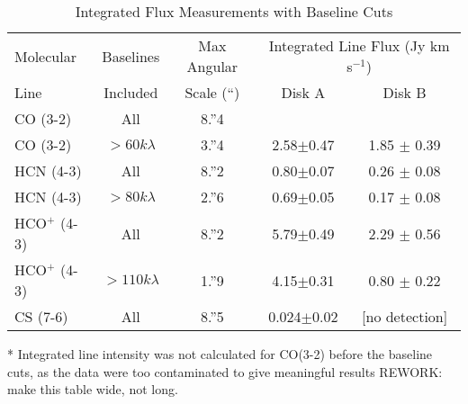 



\begin{table}
  \begin{threeparttable}
    \centering
    \caption{Integrated Flux Measurements with Baseline Cuts}
    \label{tab:baseline_cutting_table}
    \renewcommand{\arraystretch}{1.2}
    \begin{tabular}{l | c | c | c  c }
      \toprule \toprule
      {Molecular}     & Baselines       & Max Angular      & \multicolumn{2}{c}{Integrated Line Flux (Jy km s$^{-1}$)} \\
      Line            & Included        & Scale (``)       & Disk A        & Disk B \\
      \midrule %
      CO (3-2)        & All             & 8.''4        & \tnote{*}      &  \tnote{*} \\
      CO (3-2)        & $>60 k\lambda$  & 3.''4        & 2.58$\pm$0.47  & 1.85 $\pm$ 0.39 \\
      HCN (4-3)       & All             & 8.''2        & 0.80$\pm$0.07  &  0.26 $\pm$ 0.08 \\
      HCN (4-3)       & $>80 k\lambda$  & 2.''6        & 0.69$\pm$0.05  &  0.17 $\pm$ 0.08 \\
      HCO$^{+}$ (4-3) & All             & 8.''2        & 5.79$\pm$0.49  &  2.29 $\pm$ 0.56 \\
      HCO$^{+}$ (4-3) & $>110 k\lambda$ & 1.''9        & 4.15$\pm$0.31  &  0.80 $\pm$ 0.22 \\
      CS (7-6)        & All             & 8.''5        & 0.024$\pm$0.02 & [no detection] \\
      \bottomrule
    \end{tabular}
    \begin{tablenotes}\footnotesize
      \item[*] Integrated line intensity was not calculated for CO(3-2) before the baseline cuts, as the data were too contaminated to give meaningful results REWORK: make this table wide, not long.
    \end{tablenotes}
  \end{threeparttable}
\end{table}








